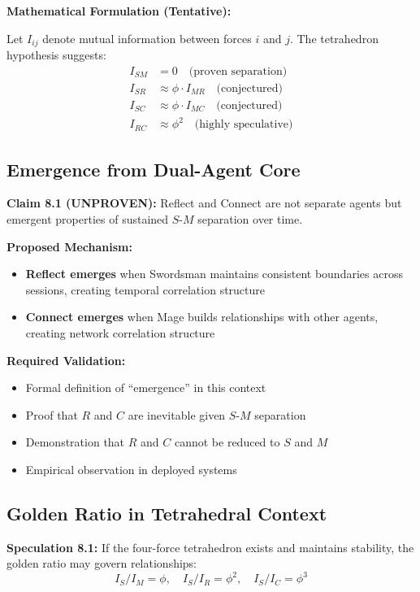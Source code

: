 \documentclass[11pt,a4paper]{article}
\theoremstyle{definition}
\begin{document}
\textbf{Mathematical Formulation (Tentative):}

Let $I_{ij}$ denote mutual information between forces $i$ and $j$. The tetrahedron hypothesis suggests:
\begin{align}
I_{SM} &= 0 \quad \text{(proven separation)} \\
I_{SR} &\approx \phi \cdot I_{MR} \quad \text{(conjectured)} \\
I_{SC} &\approx \phi \cdot I_{MC} \quad \text{(conjectured)} \\
I_{RC} &\approx \phi^2 \quad \text{(highly speculative)}
\end{align}

\subsection{Emergence from Dual-Agent Core}

\textbf{Claim 8.1 (UNPROVEN):} Reflect and Connect are not separate agents but emergent properties of sustained $S$-$M$ separation over time.

\textbf{Proposed Mechanism:}

\begin{itemize}
    \item \textbf{Reflect emerges} when Swordsman maintains consistent boundaries across sessions, creating temporal correlation structure
    \item \textbf{Connect emerges} when Mage builds relationships with other agents, creating network correlation structure
\end{itemize}

\textbf{Required Validation:}

\begin{itemize}
    \item Formal definition of ``emergence'' in this context
    \item Proof that $R$ and $C$ are inevitable given $S$-$M$ separation
    \item Demonstration that $R$ and $C$ cannot be reduced to $S$ and $M$
    \item Empirical observation in deployed systems
\end{itemize}

\subsection{Golden Ratio in Tetrahedral Context}

\textbf{Speculation 8.1:} If the four-force tetrahedron exists and maintains stability, the golden ratio may govern relationships:
\[
I_S/I_M = \phi, \quad I_S/I_R = \phi^2, \quad I_S/I_C = \phi^3
\]
\end{document}
